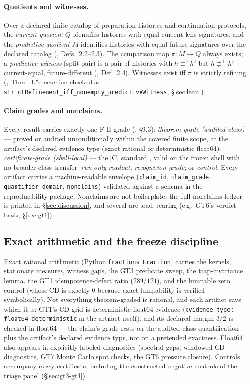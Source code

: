 \documentclass[11pt]{article}
\newcommand{\sbtcite}[1]{\cite{#1}}
\theoremstyle{definition}
\begin{document}
\paragraph{Quotients and witnesses.} Over a declared finite catalog of preparation histories and
continuation protocols, the \emph{current quotient} $Q$ identifies histories with equal current
lens signatures, and the \emph{predictive quotient} $M$ identifies histories with equal future
signatures over the declared catalog (\sbtcite{sbt-paper-a}, Defs.~2.2--2.3). The comparison map
$\pi: M \to Q$ always exists; a \emph{predictive witness} (split pair) is a pair of histories with
$h \equiv^{0} h'$ but $h \not\equiv^{+} h'$ --- current-equal, future-different
(\sbtcite{sbt-paper-a}, Def.~2.4). Witnesses exist iff $\pi$ is strictly refining
(\sbtcite{sbt-paper-a}, Thm.~3.5; machine-checked as
\texttt{strictRefinement\_iff\_nonempty\_predictiveWitness}, \S\ref{sec:lean}).

\paragraph{Claim grades and nonclaims.} Every result carries exactly one F-II grade
(\sbtcite{sbt-foundations-ii}, \S9.3): \emph{theorem-grade (audited class)} --- proved or audited
unconditionally within the covered finite scope, at the artifact's declared evidence type (exact
rational or deterministic float64); \emph{certificate-grade (shell-local)} --- the [C]
standard \sbtcite{sbt-paper-c}, valid on the frozen shell with no broader-class transfer;
\emph{run-only readout}; \emph{recognition-grade}; or \emph{control}. Every artifact carries a
machine-readable envelope (\texttt{claim\_id}, \texttt{claim\_grade}, \texttt{quantifier\_domain},
\texttt{nonclaims}) validated against a schema in the reproducibility package. Nonclaims are not
boilerplate: the full nonclaims ledger is printed in \S\ref{sec:discussion}, and several are
load-bearing (e.g.\ GT6's verdict basis, \S\ref{sec:gt6}).

\subsection{Exact arithmetic and the freeze discipline}

Exact rational arithmetic (Python \texttt{fractions.Fraction}) carries the kernels, stationary
measures, witness gaps, the GT3 predicate sweep, the trap-invariance lemma, the GT1
idempotence-defect ratio ($289/121$), and the lumpable zero control (whose CD is exactly $0$
because exact lumpability is verified symbolically). Not everything theorem-graded is rational,
and each artifact says which it is: GT1's CD grid is deterministic float64 evidence
(\texttt{evidence\_type: float64\_deterministic} in the artifact itself), and its declared margin
$3/2$ is checked in float64 --- the claim's grade rests on the audited-class quantification plus
the artifact's declared evidence type, not on a pretended exactness. Float64 also appears in
explicitly labeled diagnostics (spectral gaps, windowed CD diagnostics, GT7 Monte Carlo spot
checks, the GT6 pressure closure). Controls accompany every certificate, including the
constructed negative controls of the triage panel (\S\ref{sec:gt3-gt4}).
\end{document}
